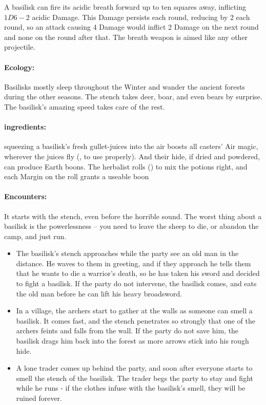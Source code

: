 \begin{multicols}{2}
A basilisk can fire its acidic breath forward up to ten squares away, inflicting $1D6-2$ acidic Damage.
This Damage persists each round, reducing by 2  each round, so an attack causing 4 Damage would inflict 2  Damage on the next round and none on the round after that.
The breath weapon is aimed like any other projectile.

\paragraph{Ecology:} Basilisks mostly sleep throughout the Winter and wander the ancient forests during the other seasons.
The stench takes deer, boar, and even bears by surprise.
The basilisk's amazing speed takes care of the rest.

\paragraph{\Glspl{ingredient}:}
squeezing a basilisk's fresh gullet-juices into the air boosts all casters' Air magic, wherever the juices fly (, \tn[10] to use properly).
And their hide, if dried and powdered, can produce Earth \glspl{boon}.
The herbalist rolls  (\tn[10]) to mix the potions right, and each Margin on the roll grants a useable \gls{boon}

\paragraph{Encounters:} It starts with the stench, even before the horrible sound.
The worst thing about a basilisk is the powerlessness -- you need to leave the sheep to die, or abandon the camp, and just run.

\begin{itemize}

  \item{The basilisk's stench approaches while the party see an old man in the distance.
  He waves to them in greeting, and if they approach he tells them that he wants to die a warrior's death, so he has taken his sword and decided to fight a basilisk.
  If the party do not intervene, the basilisk comes, and eats the old man before he can lift his heavy broadsword.}
  \item
  In a village, the archers start to gather at the walls as someone can smell a basilisk.
  It comes fast, and the stench penetrates so strongly that one of the archers feints and falls from the wall.
  If the party do not save him, the basilisk drags him back into the forest as more arrows stick into his rough hide.
  \item
  A lone trader comes up behind the party, and soon after everyone starts to smell the stench of the basilisk.
  The trader begs the party to stay and fight while he runs - if the clothes infuse with the basilisk's smell, they will be ruined forever.
  


\end{itemize}
\end{multicols}
